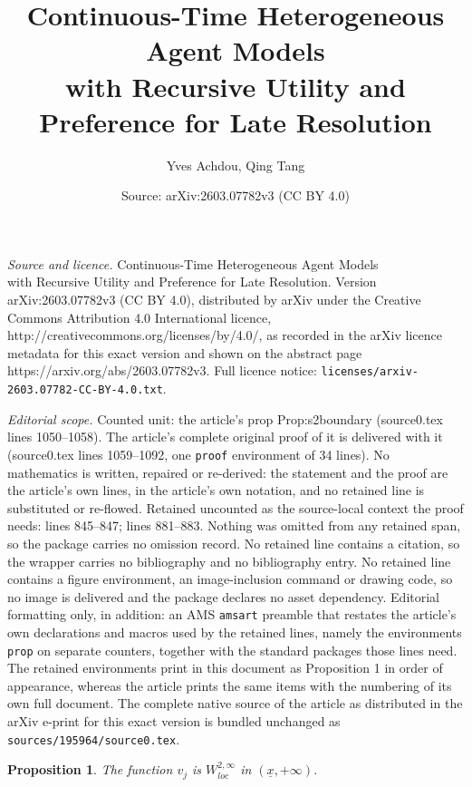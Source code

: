 \documentclass[10pt,a4paper]{amsart}
\title{Continuous-Time Heterogeneous Agent Models \\with Recursive Utility and Preference for Late Resolution}
\author{Yves Achdou, Qing Tang}
\date{Source: arXiv:2603.07782v3 (CC BY 4.0)}
\newtheorem{prop}{Proposition}
\newcommand{\ux}{{\underline x}}
\begin{document}
\maketitle

\noindent\emph{Source and licence.} Continuous-Time Heterogeneous Agent Models \\with Recursive Utility and Preference for Late Resolution. Version arXiv:2603.07782v3 (CC BY 4.0), distributed by arXiv under the Creative Commons Attribution 4.0 International licence, http://creativecommons.org/licenses/by/4.0/, as recorded in the arXiv licence metadata for this exact version and shown on the abstract page https://arxiv.org/abs/2603.07782v3. Full licence notice: \texttt{licenses/arxiv-2603.07782-CC-BY-4.0.txt}.\par\smallskip

\noindent\textit{Editorial scope.} Counted unit: the article's prop Prop:s2boundary (source0.tex lines 1050--1058). The article's complete original proof of it is delivered with it (source0.tex lines 1059--1092, one \texttt{proof} environment of 34 lines). No mathematics is written, repaired or re-derived: the statement and the proof are the article's own lines, in the article's own notation, and no retained line is substituted or re-flowed.  Retained uncounted as the source-local context the proof needs: lines 845--847; lines 881--883.  Nothing was omitted from any retained span, so the package carries no omission record.  No retained line contains a citation, so the wrapper carries no bibliography and no bibliography entry.  No retained line contains a figure environment, an image-inclusion command or drawing code, so no image is delivered and the package declares no asset dependency.  Editorial formatting only, in addition: an AMS \texttt{amsart} preamble that restates the article's own declarations and macros used by the retained lines, namely the environments \texttt{prop} on separate counters, together with the standard packages those lines need.  The retained environments print in this document as Proposition 1 in order of appearance, whereas the article prints the same items with the numbering of its own full document.  The complete native source of the article as distributed in the arXiv e-print for this exact version is bundled unchanged as \texttt{sources/195964/source0.tex}.
\begin{prop}\label{Prop:v W2}
The function $v_j$ is $W^{2,\infty}_{loc}$ in $(\ux,+\infty)$. 
\end{prop}
\end{document}
